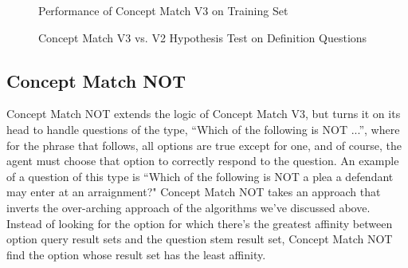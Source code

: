 \begin{figure}
\centering
\vspace{0.75in}
\caption{Performance of Concept Match V3 on Training Set}
\label{fig:concept_match_v3_training_set_performance}
\end{figure}



\begin{figure}
\centering
\vspace{0.75in}
\caption{Concept Match V3 vs. V2 Hypothesis Test on Definition Questions}
\label{fig:concept_match_v3_hypothesis_test}
\end{figure}



\subsection{Concept Match NOT}

Concept Match NOT extends the logic of Concept Match V3, but turns it on its head to handle questions of the type, ``Which of the following is NOT ...'', where for the phrase that follows, all options are true except for one, and of course, the agent must choose that option to correctly respond to the question.  An example of a question of this type is ``Which of the following is NOT a plea a defendant may enter at an arraignment?"
Concept Match NOT takes an approach that inverts the over-arching approach of the algorithms we've discussed above.  Instead of looking for the option for which there's the greatest affinity between option query result sets and the question stem result set, Concept Match NOT find the option whose result set has the least affinity.  

